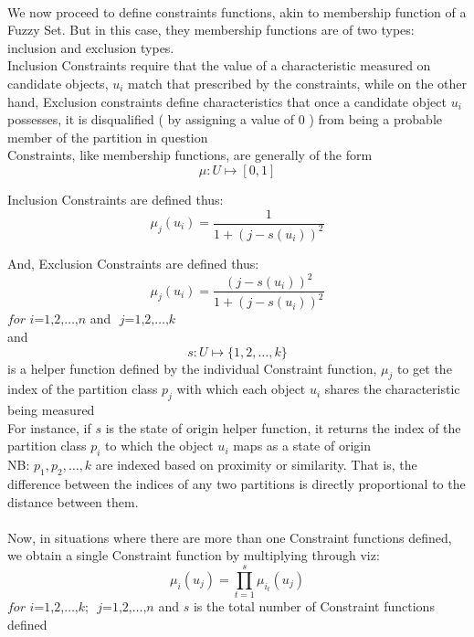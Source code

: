 \documentclass[a4paper,openany]{book}
\begin{document}
			\paragraph{}
				We now proceed to define constraints functions, akin to membership function of a Fuzzy Set. But in this case, they membership functions are of two types: inclusion and exclusion types.\\
				Inclusion Constraints require that the value of a characteristic measured on candidate objects, $u_i$ match that prescribed by the constraints, while on the other hand, Exclusion constraints define characteristics that once a candidate object $u_i$ possesses, it is disqualified ( by assigning a value of 0 ) from being a probable member of the partition in question\\
				Constraints, like membership functions, are generally of the form
				\[
					\mu \colon U \mapsto [ 0,1 ]
				\]
				
				Inclusion Constraints are defined thus:
				\begin{equation}
					\mu_j(u_i) = \frac{1}{1+\left( j - s(u_i) \right)^2}
				\end{equation}
				
				And, Exclusion Constraints are defined thus:
				\begin{equation}
					\mu_j(u_i) = \frac{\left( j - s(u_i) \right)^2}{1+\left( j - s(u_i) \right)^2}
				\end{equation}
				$\textit{for i=1,2,}\dots\text{,}n$ and $\textit{ j=1,2,}\dots\text{,}k$\\
				and
				\begin{equation}
					s\colon U\mapsto \{ 1,2,\dots,k \}
				\end{equation}
				is a helper function defined by the individual Constraint function, $\mu_j$ to get the index of the partition class $p_j$ with which each object $u_i$ shares the characteristic being measured\\
				For instance, if $s$ is the state of origin helper function, it returns the index of the partition class $p_i$ to which the object $u_i$ maps as a state of origin\\
				NB: $p_1, p_2,\dots,k$ are indexed based on proximity or similarity. That is, the difference between the indices of any two partitions is directly proportional to the distance between them.
			\paragraph{}
				Now, in situations where there are more than one Constraint functions defined, we obtain a single Constraint function by multiplying through viz:
				\begin{equation}
					\mu_i(u_j) = \prod_{t=1}^{s}{\mu_{i_t}(u_j)}
				\end{equation}
				$\textit{for i=1,2,}\dots\text{,}k$; $\textit{ j=1,2,}\dots\text{,}n$ and $s$ is the total number of Constraint functions defined
\end{document}
